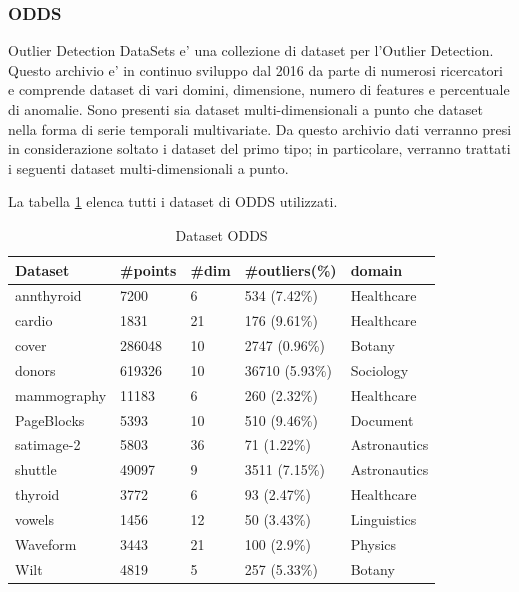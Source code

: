 \subsubsection{ODDS}
Outlier Detection DataSets e' una collezione di dataset per l'Outlier Detection. Questo archivio e' in continuo sviluppo dal 2016 da parte di numerosi ricercatori e comprende dataset di vari domini, dimensione, numero di features e percentuale di anomalie. 
Sono presenti sia dataset multi-dimensionali a punto che dataset nella forma di serie temporali multivariate. Da questo archivio dati verranno presi in considerazione soltato i dataset del primo tipo; in particolare, verranno trattati i seguenti dataset multi-dimensionali a punto.

La tabella \ref{odds} elenca tutti i dataset di ODDS utilizzati.

\begin{table}
	
	\centering
	\begin{tabular}{|l|l|l|l|l|}
		\hline
		\textbf{Dataset} & \textbf{\#points} & \textbf{\#dim} & \textbf{\#outliers(\%)} & \textbf{domain} \\ \hline
		annthyroid       & 7200              & 6              & 534 (7.42\%)            & Healthcare      \\ \hline
		cardio           & 1831              & 21             & 176 (9.61\%)            & Healthcare      \\ \hline
		cover            & 286048            & 10             & 2747 (0.96\%)           & Botany          \\ \hline
		donors           & 619326            & 10             & 36710 (5.93\%)          & Sociology       \\ \hline
		mammography      & 11183             & 6              & 260 (2.32\%)            & Healthcare      \\ \hline
		PageBlocks       & 5393              & 10             & 510 (9.46\%)            & Document        \\ \hline
		satimage-2       & 5803              & 36             & 71 (1.22\%)             & Astronautics    \\ \hline
		shuttle          & 49097             & 9              & 3511 (7.15\%)           & Astronautics    \\ \hline
		thyroid          & 3772              & 6              & 93 (2.47\%)             & Healthcare      \\ \hline
		vowels           & 1456              & 12             & 50 (3.43\%)             & Linguistics     \\ \hline
		Waveform         & 3443              & 21             & 100 (2.9\%)             & Physics         \\ \hline
		Wilt             & 4819              & 5              & 257 (5.33\%)            & Botany          \\ \hline
	\end{tabular}
	\caption{\label{odds}Dataset ODDS}
\end{table}


